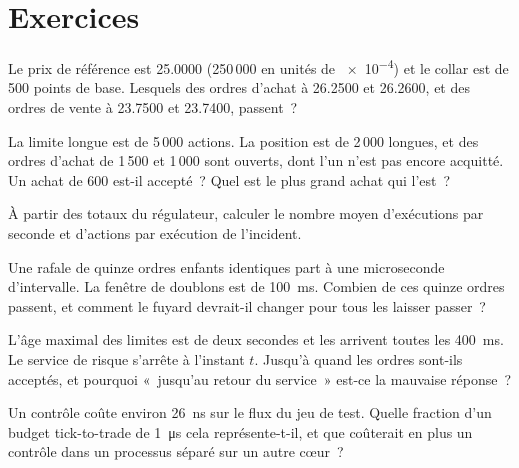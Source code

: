 \section{Exercices}

\begin{exercise}[$\star$]\label{exo:ll:pre-trade-risk-and-kill-switches:1}
Le prix de référence est 25.0000 (250\,000 en unités de \num{e-4}) et le collar est de 500 points de base. Lesquels des ordres d'achat à
26.2500 et 26.2600, et des ordres de vente à 23.7500 et 23.7400, passent~?
\end{exercise}

\begin{exercise}[$\star$]\label{exo:ll:pre-trade-risk-and-kill-switches:2}
La limite longue est de 5\,000 actions. La position est de 2\,000 longues, et des ordres d'achat de 1\,500 et 1\,000 sont ouverts, dont l'un n'est pas
encore acquitté. Un achat de 600 est-il accepté~? Quel est le plus grand achat qui l'est~?
\end{exercise}

\begin{exercise}[$\star$]\label{exo:ll:pre-trade-risk-and-kill-switches:3}
À partir des totaux du régulateur, calculer le nombre moyen d'exécutions par seconde et d'actions par exécution de l'incident.
\end{exercise}

\begin{exercise}[$\star\star$]\label{exo:ll:pre-trade-risk-and-kill-switches:4}
Une rafale de quinze ordres enfants identiques part à une microseconde d'intervalle. La fenêtre de doublons est de \qty{100}{\milli\second}. Combien
de ces quinze ordres passent, et comment le fuyard devrait-il changer pour tous les laisser passer~?
\end{exercise}

\begin{exercise}[$\star\star$]\label{exo:ll:pre-trade-risk-and-kill-switches:5}
L'âge maximal des limites est de deux secondes et les  arrivent toutes les \qty{400}{\milli\second}. Le service de risque s'arrête à l'instant
$t$. Jusqu'à quand les ordres sont-ils acceptés, et pourquoi «~jusqu'au retour du service~» est-ce la mauvaise réponse~?
\end{exercise}

\begin{exercise}[$\star\star$]\label{exo:ll:pre-trade-risk-and-kill-switches:6}
Un contrôle coûte environ \qty{26}{\nano\second} sur le flux du jeu de test. Quelle fraction d'un budget tick-to-trade de
\qty{1}{\micro\second} cela représente-t-il, et que coûterait en plus un contrôle dans un processus séparé sur un autre cœur~?
\end{exercise}

